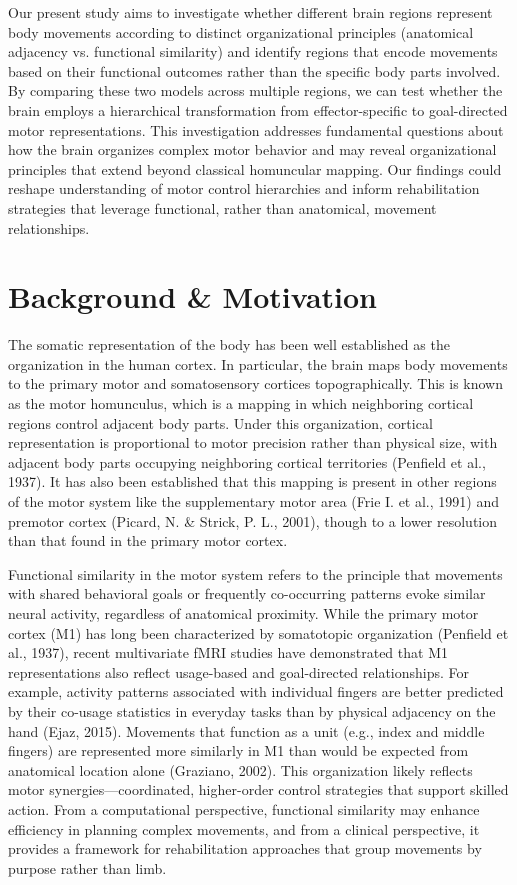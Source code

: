\documentclass{article}
\begin{document}
Our present study aims to investigate whether different brain regions represent body movements according to distinct organizational principles (anatomical adjacency vs. functional similarity) and identify regions that encode movements based on their functional outcomes rather than the specific body parts involved. By comparing these two models across multiple regions, we can test whether the brain employs a hierarchical transformation from effector-specific to goal-directed motor representations. This investigation addresses fundamental questions about how the brain organizes complex motor behavior and may reveal organizational principles that extend beyond classical homuncular mapping. Our findings could reshape understanding of motor control hierarchies and inform rehabilitation strategies that leverage functional, rather than anatomical, movement relationships.

\section{Background \& Motivation}
The somatic representation of the body has been well established as the organization in the human cortex. In particular, the brain maps body movements to the primary motor and somatosensory cortices topographically. This is known as the motor homunculus, which is a mapping in which neighboring cortical regions control adjacent body parts. Under this organization, cortical representation is proportional to motor precision rather than physical size, with adjacent body parts occupying neighboring cortical territories (Penfield et al., 1937). It has also been established that this mapping is present in other regions of the motor system like the supplementary motor area (Frie I. et al., 1991) and premotor cortex (Picard, N. \& Strick, P. L., 2001), though to a lower resolution than that found in the primary motor cortex. 

Functional similarity in the motor system refers to the principle that movements with shared behavioral goals or frequently co-occurring patterns evoke similar neural activity, regardless of anatomical proximity. While the primary motor cortex (M1) has long been characterized by somatotopic organization (Penfield et al., 1937), recent multivariate fMRI studies have demonstrated that M1 representations also reflect usage-based and goal-directed relationships. For example, activity patterns associated with individual fingers are better predicted by their co-usage statistics in everyday tasks than by physical adjacency on the hand (Ejaz, 2015). Movements that function as a unit (e.g., index and middle fingers) are represented more similarly in M1 than would be expected from anatomical location alone (Graziano, 2002). This organization likely reflects motor synergies—coordinated, higher-order control strategies that support skilled action. From a computational perspective, functional similarity may enhance efficiency in planning complex movements, and from a clinical perspective, it provides a framework for rehabilitation approaches that group movements by purpose rather than limb.
\end{document}
